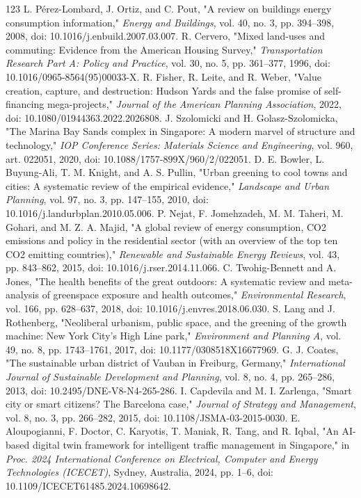 \documentclass[journal]{IEEEtran}
\begin{document}
\begin{thebibliography}{123}
 L. P\'erez-Lombard, J. Ortiz, and C. Pout, "A review on buildings energy consumption information," \emph{Energy and Buildings}, vol. 40, no. 3, pp. 394--398, 2008, doi: 10.1016/j.enbuild.2007.03.007.
 R. Cervero, "Mixed land-uses and commuting: Evidence from the American Housing Survey," \emph{Transportation Research Part A: Policy and Practice}, vol. 30, no. 5, pp. 361--377, 1996, doi: 10.1016/0965-8564(95)00033-X.
 R. Fisher, R. Leite, and R. Weber, "Value creation, capture, and destruction: Hudson Yards and the false promise of self-financing mega-projects," \emph{Journal of the American Planning Association}, 2022, doi: 10.1080/01944363.2022.2026808.
 J. Szolomicki and H. Golasz-Szolomicka, "The Marina Bay Sands complex in Singapore: A modern marvel of structure and technology," \emph{IOP Conference Series: Materials Science and Engineering}, vol. 960, art. 022051, 2020, doi: 10.1088/1757-899X/960/2/022051.
 D. E. Bowler, L. Buyung-Ali, T. M. Knight, and A. S. Pullin, "Urban greening to cool towns and cities: A systematic review of the empirical evidence," \emph{Landscape and Urban Planning}, vol. 97, no. 3, pp. 147--155, 2010, doi: 10.1016/j.landurbplan.2010.05.006.
 P. Nejat, F. Jomehzadeh, M. M. Taheri, M. Gohari, and M. Z. A. Majid, "A global review of energy consumption, CO2 emissions and policy in the residential sector (with an overview of the top ten CO2 emitting countries)," \emph{Renewable and Sustainable Energy Reviews}, vol. 43, pp. 843--862, 2015, doi: 10.1016/j.rser.2014.11.066.
 C. Twohig-Bennett and A. Jones, "The health benefits of the great outdoors: A systematic review and meta-analysis of greenspace exposure and health outcomes," \emph{Environmental Research}, vol. 166, pp. 628--637, 2018, doi: 10.1016/j.envres.2018.06.030.
 S. Lang and J. Rothenberg, "Neoliberal urbanism, public space, and the greening of the growth machine: New York City's High Line park," \emph{Environment and Planning A}, vol. 49, no. 8, pp. 1743--1761, 2017, doi: 10.1177/0308518X16677969.
 G. J. Coates, "The sustainable urban district of Vauban in Freiburg, Germany," \emph{International Journal of Sustainable Development and Planning}, vol. 8, no. 4, pp. 265--286, 2013, doi: 10.2495/DNE-V8-N4-265-286.
 I. Capdevila and M. I. Zarlenga, "Smart city or smart citizens? The Barcelona case," \emph{Journal of Strategy and Management}, vol. 8, no. 3, pp. 266--282, 2015, doi: 10.1108/JSMA-03-2015-0030.
 E. Aloupogianni, F. Doctor, C. Karyotis, T. Maniak, R. Tang, and R. Iqbal, "An AI-based digital twin framework for intelligent traffic management in Singapore," in \emph{Proc. 2024 International Conference on Electrical, Computer and Energy Technologies (ICECET)}, Sydney, Australia, 2024, pp. 1--6, doi: 10.1109/ICECET61485.2024.10698642.

\end{thebibliography}
\end{document}
